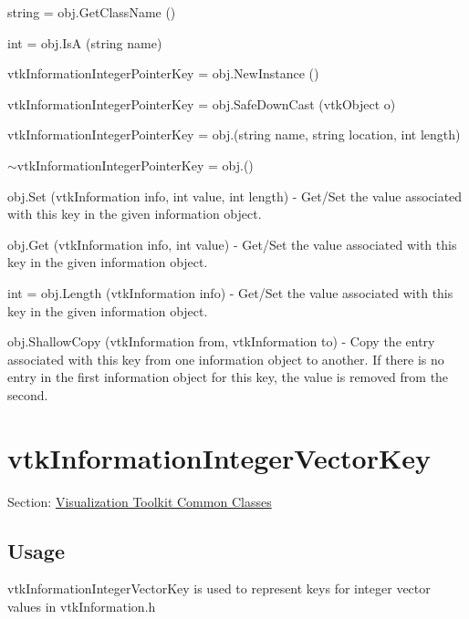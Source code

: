\begin{DoxyItemize}
\item {\ttfamily string = obj.\-Get\-Class\-Name ()}  
\item {\ttfamily int = obj.\-Is\-A (string name)}  
\item {\ttfamily vtk\-Information\-Integer\-Pointer\-Key = obj.\-New\-Instance ()}  
\item {\ttfamily vtk\-Information\-Integer\-Pointer\-Key = obj.\-Safe\-Down\-Cast (vtk\-Object o)}  
\item {\ttfamily vtk\-Information\-Integer\-Pointer\-Key = obj.(string name, string location, int length)}  
\item {\ttfamily $\sim$vtk\-Information\-Integer\-Pointer\-Key = obj.()}  
\item {\ttfamily obj.\-Set (vtk\-Information info, int value, int length)} -\/ Get/\-Set the value associated with this key in the given information object.  
\item {\ttfamily obj.\-Get (vtk\-Information info, int value)} -\/ Get/\-Set the value associated with this key in the given information object.  
\item {\ttfamily int = obj.\-Length (vtk\-Information info)} -\/ Get/\-Set the value associated with this key in the given information object.  
\item {\ttfamily obj.\-Shallow\-Copy (vtk\-Information from, vtk\-Information to)} -\/ Copy the entry associated with this key from one information object to another. If there is no entry in the first information object for this key, the value is removed from the second.  
\end{DoxyItemize}\hypertarget{vtkcommon_vtkinformationintegervectorkey}{}\section{vtk\-Information\-Integer\-Vector\-Key}\label{vtkcommon_vtkinformationintegervectorkey}
Section\-: \hyperlink{sec_vtkcommon}{Visualization Toolkit Common Classes} \hypertarget{vtkwidgets_vtkxyplotwidget_Usage}{}\subsection{Usage}\label{vtkwidgets_vtkxyplotwidget_Usage}
vtk\-Information\-Integer\-Vector\-Key is used to represent keys for integer vector values in vtk\-Information.\-h

